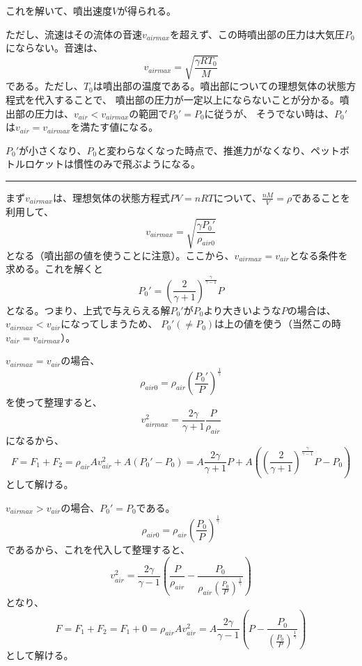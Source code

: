 \documentclass{article}
\begin{document}
これを解いて、噴出速度$V$が得られる。

ただし、流速はその流体の音速$v_{airmax}$を超えず、この時噴出部の圧力は大気圧$P_0$にならない。音速は、
\begin{equation}
v_{airmax} = \sqrt{\frac{\gamma R T_0}{M}}
\end{equation}
である。ただし、$T_0$は噴出部の温度である。噴出部についての理想気体の状態方程式を代入することで、
噴出部の圧力が一定以上にならないことが分かる。噴出部の圧力は、$v_{air} < v_{airmax}$の範囲で$P_0'=P_0$に従うが、
そうでない時は、$P_0'$は$v_{air} = v_{airmax}$を満たす値になる。

$P_0'$が小さくなり、$P_0$と変わらなくなった時点で、推進力がなくなり、ペットボトルロケットは慣性のみで飛ぶようになる。

\vspace{3mm}
\hrule
\vspace{3mm}

まず$v_{airmax}$は、理想気体の状態方程式$P V = n R T$について、$\frac{n M}{V} = \rho$であることを利用して、
\begin{equation}
v_{airmax} = \sqrt{\frac{\gamma P_0'}{\rho_{air0}}}
\end{equation}
となる（噴出部の値を使うことに注意）。ここから、$v_{airmax} = v_{air}$となる条件を求める。これを解くと
\begin{equation}
P_0'=\left(\frac{2}{\gamma+1}\right)^{\frac{\gamma}{\gamma-1}}P
\end{equation}
となる。つまり、上式で与えらえる解$P_0'$が$P_0$より大きいような$P$の場合は、$v_{airmax} < v_{air}$になってしまうため、
$P_0'(\neq P_0)$は上の値を使う（当然この時$v_{air} = v_{airmax}$）。

$v_{airmax} = v_{air}$の場合、
\begin{equation}
\rho_{air0} = \rho_{air} \left(\frac{P_0'}{P}\right)^{\frac{1}{\gamma}}
\end{equation}
を使って整理すると、
\begin{equation}
v_{airmax}^2 =  \frac{2 \gamma} {\gamma + 1} \frac{P}{\rho_{air}}
\end{equation}
になるから、
\begin{equation}
F=F_1+F_2=\rho_{air} A v_{air}^2 + A (P_0' - P_0) = A \frac{2 \gamma} {\gamma + 1} P + A \left(\left(\frac{2}{\gamma+1}\right)^{\frac{\gamma}{\gamma-1}}P - P_0  \right)
\end{equation}
として解ける。

$v_{airmax} > v_{air}$の場合、$P_0'=P_0$である。
\begin{equation}
\rho_{air0} = \rho_{air} \left(\frac{P_0}{P}\right)^{\frac{1}{\gamma}}
\end{equation}
であるから、これを代入して整理すると、
\begin{equation}
v_{air}^2 = \frac{2 \gamma}{\gamma -1}\left(\frac{P}{\rho_{air}} - \frac{P_0}{\rho_{air} \left( \frac{P_0}{P} \right)^{\frac{1}{\gamma}}} \right)
\end{equation}
となり、
\begin{equation}
F=F_1+F_2=F_1+0=\rho_{air} A v_{air}^2 = A \frac{2 \gamma}{\gamma -1}\left(P - \frac{P_0}{\left( \frac{P_0}{P} \right)^{\frac{1}{\gamma}}} \right)
\end{equation}
として解ける。
\end{document}
